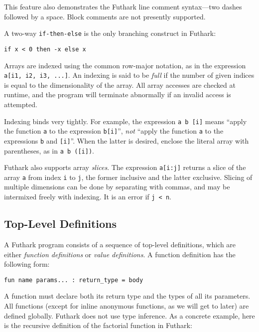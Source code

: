\documentclass[oneside,11pt]{book}
\begin{document}
\noindent
This feature also demonstrates the Futhark line comment syntax---two dashes
followed by a space.  Block comments are not presently supported.

A two-way \texttt{if-then-else} is the only branching construct in
Futhark:

\begin{lstlisting}
if x < 0 then -x else x
\end{lstlisting}

Arrays are indexed using the common row-major notation, as in the expression
\texttt{a[i1, i2, i3, ...]}.  An indexing is said to be \textit{full} if
the number of given indices is equal to the dimensionality of the
array.  All array accesses are checked at runtime, and the program
will terminate abnormally if an invalid access is attempted.

Indexing binds very tightly.  For example, the expression
\texttt{a~b~[i]} means ``apply the function \texttt{a} to the
expression \texttt{b[i]}'', \textit{not} ``apply the function
\texttt{a} to the expressions \texttt{b} and \texttt{[i]}''.  When the
latter is desired, enclose the literal array with parentheses, as in
\texttt{a~b~([i])}.

Futhark also supports array \textit{slices}.  The expression
\texttt{a[i:j]} returns a slice of the array \texttt{a} from index
\texttt{i} to \texttt{j}, the former inclusive and the latter
exclusive.  Slicing of multiple dimensions can be done by separating
with commas, and may be intermixed freely with indexing.  It is an
error if \texttt{j < n}.

\subsection{Top-Level Definitions}
\label{sec:function-declarations}

A Futhark program consists of a sequence of top-level definitions,
which are either \textit{function definitions} or \textit{value
  definitions}.  A function definition has the following form:

\begin{lstlisting}
fun name params... : return_type = body
\end{lstlisting}

\noindent
A function must declare both its return type and the types of all its
parameters.  All functions (except for inline anonymous functions, as
we will get to later) are defined globally.  Futhark does not use type
inference.  As a concrete example, here is the recursive definition of
the factorial function in Futhark:
\end{document}
